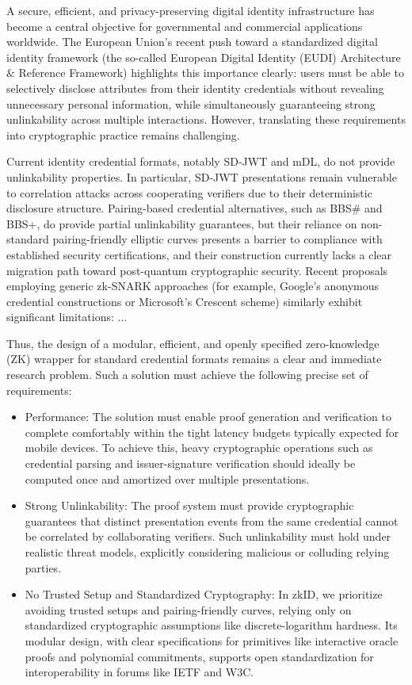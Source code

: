 A secure, efficient, and privacy-preserving digital identity infrastructure has become a central objective for governmental and commercial applications worldwide. The European Union’s recent push toward a standardized digital identity framework (the so-called European Digital Identity (EUDI) Architecture$\&$ Reference Framework) highlights this importance clearly: users must be able to selectively disclose attributes from their identity credentials without revealing unnecessary personal information, while simultaneously guaranteeing strong unlinkability across multiple interactions. However, translating these requirements into cryptographic practice remains challenging.~\cite{TODO}

Current identity credential formats, notably SD-JWT and mDL, do not provide unlinkability properties. In particular, SD-JWT presentations remain vulnerable to correlation attacks across cooperating verifiers due to their deterministic disclosure structure. Pairing-based credential alternatives, such as BBS$\#$ and BBS+, do provide partial unlinkability guarantees, but their reliance on non-standard pairing-friendly elliptic curves presents a barrier to compliance with established security certifications, and their construction currently lacks a clear migration path toward post-quantum cryptographic security. Recent proposals employing generic zk-SNARK approaches (for example, Google's anonymous credential constructions or Microsoft's Crescent scheme) similarly exhibit significant limitations: ...

Thus, the design of a modular, efficient, and openly specified zero-knowledge (ZK) wrapper for standard credential formats remains a clear and immediate research problem. Such a solution must achieve the following precise set of requirements:
\begin{itemize}
    \item Performance: The solution must enable proof generation and verification to complete comfortably within the tight latency budgets typically expected for mobile devices. To achieve this, heavy cryptographic operations such as credential parsing and issuer-signature verification should ideally be computed once and amortized over multiple presentations.
    \item Strong Unlinkability: The proof system must provide cryptographic guarantees that distinct presentation events from the same credential cannot be correlated by collaborating verifiers. Such unlinkability must hold under realistic threat models, explicitly considering malicious or colluding relying parties.
    \item No Trusted Setup and Standardized Cryptography: In zkID, we prioritize avoiding trusted setups and pairing-friendly curves, relying only on standardized cryptographic assumptions like discrete-logarithm hardness. Its modular design, with clear specifications for primitives like interactive oracle proofs and polynomial commitments, supports open standardization for interoperability in forums like IETF and W3C.
\end{itemize}


